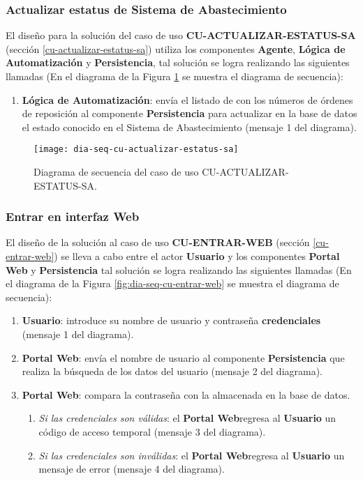 \subsubsection{Actualizar estatus de Sistema de Abastecimiento}
El diseño para la solución del caso de uso \textbf{CU-ACTUALIZAR-ESTATUS-SA} (sección \ref{cu-actualizar-estatus-sa}) utiliza los componentes \textbf{Agente}, \textbf{Lógica de Automatización} y \textbf{Persistencia}, tal solución se logra realizando las siguientes llamadas (En el diagrama de la Figura \ref{fig:dia-seq-cu-actualizar-estatus-sa} se muestra el diagrama de secuencia):
\begin{enumerate}
	\item \textbf{Lógica de Automatización}: envía el listado de con los números de órdenes de reposición al componente \textbf{Persistencia} para actualizar en la base de datos el estado conocido en el Sistema de Abastecimiento (mensaje 1 del diagrama).
\end{enumerate}

\begin{figure}[h]
	\centering
	\texttt{[image: dia-seq-cu-actualizar-estatus-sa]}
	\caption{Diagrama de secuencia del caso de uso CU-ACTUALIZAR-ESTATUS-SA.}
	\label{fig:dia-seq-cu-actualizar-estatus-sa}
\end{figure}

\subsubsection{Entrar en interfaz Web}
El diseño de la solución al caso de uso \textbf{CU-ENTRAR-WEB} (sección \ref{cu-entrar-web}) se lleva a cabo entre el actor \textbf{Usuario} y los componentes \textbf{Portal Web} y \textbf{Persistencia} tal solución se logra realizando las siguientes llamadas (En el diagrama de la Figura \ref{fig:dia-seq-cu-entrar-web} se muestra el diagrama de secuencia):
\begin{enumerate}
	\item \textbf{Usuario}: introduce su nombre de usuario y contraseña \textbf{credenciales} (mensaje 1 del diagrama).
	\item \textbf{Portal Web}: envía el nombre de usuario al componente \textbf{Persistencia} que realiza la búsqueda de los datos del usuario (mensaje 2 del diagrama).
	\item \textbf{Portal Web}: compara la contraseña con la almacenada en la base de datos.
	\begin{enumerate}
		\item \textit{Si las credenciales son válidas}: el \textbf{Portal Web}regresa al \textbf{Usuario} un código de acceso temporal (mensaje 3 del diagrama).
		\item \textit{Si las credenciales son inválidas}: el \textbf{Portal Web}regresa al \textbf{Usuario} un mensaje de error (mensaje 4 del diagrama).
	\end{enumerate}
\end{enumerate}

